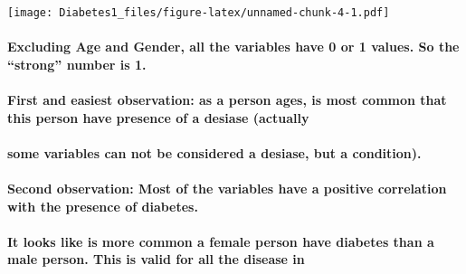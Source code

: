 \documentclass[
]{article}
\begin{document}
\texttt{[image: Diabetes1\_files/figure-latex/unnamed-chunk-4-1.pdf]}

\hypertarget{excluding-age-and-gender-all-the-variables-have-0-or-1-values.-so-the-strong-number-is-1.}{%
\paragraph{Excluding Age and Gender, all the variables have 0 or 1
values. So the ``strong'' number is
1.}\label{excluding-age-and-gender-all-the-variables-have-0-or-1-values.-so-the-strong-number-is-1.}}

\hypertarget{first-and-easiest-observation-as-a-person-ages-is-most-common-that-this-person-have-presence-of-a-desiase-actually}{%
\paragraph{First and easiest observation: as a person ages, is most
common that this person have presence of a desiase
(actually}\label{first-and-easiest-observation-as-a-person-ages-is-most-common-that-this-person-have-presence-of-a-desiase-actually}}

\hypertarget{some-variables-can-not-be-considered-a-desiase-but-a-condition.}{%
\paragraph{some variables can not be considered a desiase, but a
condition).}\label{some-variables-can-not-be-considered-a-desiase-but-a-condition.}}

\hypertarget{second-observation-most-of-the-variables-have-a-positive-correlation-with-the-presence-of-diabetes.}{%
\paragraph{Second observation: Most of the variables have a positive
correlation with the presence of
diabetes.}\label{second-observation-most-of-the-variables-have-a-positive-correlation-with-the-presence-of-diabetes.}}

\hypertarget{it-looks-like-is-more-common-a-female-person-have-diabetes-than-a-male-person.-this-is-valid-for-all-the-disease-in}{%
\paragraph{It looks like is more common a female person have diabetes
than a male person. This is valid for all the disease
in}\label{it-looks-like-is-more-common-a-female-person-have-diabetes-than-a-male-person.-this-is-valid-for-all-the-disease-in}}
\end{document}
